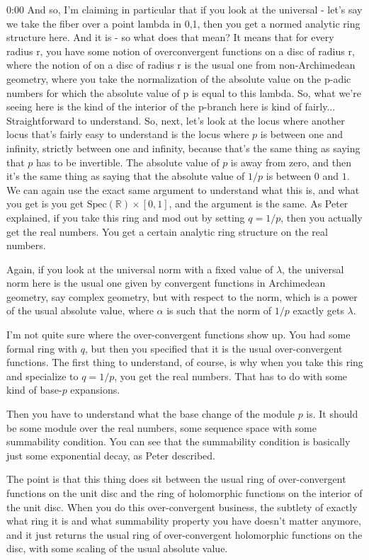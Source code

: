 \begin{unfinished}{0:00}
And so, I'm claiming in particular that if you look at the universal - let's say we take the fiber over a point lambda in 0,1, then you get a normed analytic ring structure here. And it is - so what does that mean? It means that for every radius r, you have some notion of overconvergent functions on a disc of radius r, where the notion of on a disc of radius r is the usual one from non-Archimedean geometry, where you take the normalization of the absolute value on the p-adic numbers for which the absolute value of p is equal to this lambda. So, what we're seeing here is the kind of the interior of the p-branch here is kind of fairly...
Straightforward to understand. So, next, let's look at the locus where another locus that's fairly easy to understand is the locus where $p$ is between one and infinity, strictly between one and infinity, because that's the same thing as saying that $p$ has to be invertible. The absolute value of $p$ is away from zero, and then it's the same thing as saying that the absolute value of $1/p$ is between $0$ and $1$. We can again use the exact same argument to understand what this is, and what you get is you get $\text{Spec}(\mathbb{R}) \times [0,1]$, and the argument is the same. As Peter explained, if you take this ring and mod out by setting $q = 1/p$, then you actually get the real numbers. You get a certain analytic ring structure on the real numbers.

Again, if you look at the universal norm with a fixed value of $\lambda$, the universal norm here is the usual one given by convergent functions in Archimedean geometry, say complex geometry, but with respect to the norm, which is a power of the usual absolute value, where $\alpha$ is such that the norm of $1/p$ exactly gets $\lambda$.

I'm not quite sure where the over-convergent functions show up. You had some formal ring with $q$, but then you specified that it is the usual over-convergent functions. The first thing to understand, of course, is why when you take this ring and specialize to $q = 1/p$, you get the real numbers. That has to do with some kind of base-$p$ expansions.

Then you have to understand what the base change of the module $p$ is. It should be some module over the real numbers, some sequence space with some summability condition. You can see that the summability condition is basically just some exponential decay, as Peter described.

The point is that this thing does sit between the usual ring of over-convergent functions on the unit disc and the ring of holomorphic functions on the interior of the unit disc. When you do this over-convergent business, the subtlety of exactly what ring it is and what summability property you have doesn't matter anymore, and it just returns the usual ring of over-convergent holomorphic functions on the disc, with some scaling of the usual absolute value.


\end{unfinished}
